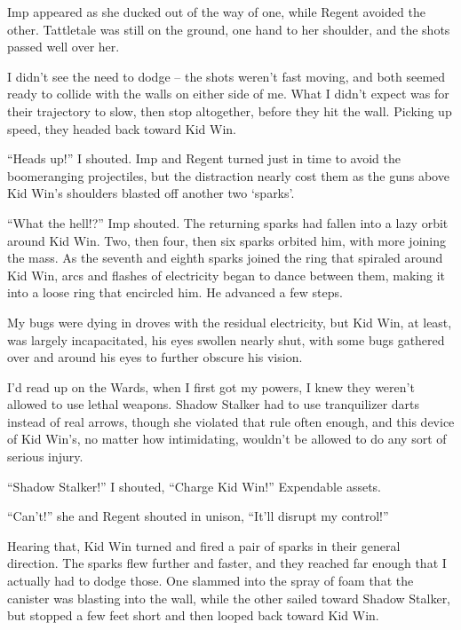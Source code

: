 Imp appeared as she ducked out of the way of one, while Regent avoided the other.  Tattletale was still on the ground, one hand to her shoulder, and the shots passed well over her.



I didn't see the need to dodge – the shots weren't fast moving, and both seemed ready to collide with the walls on either side of me.  What I didn't expect was for their trajectory to slow, then stop altogether, before they hit the wall.  Picking up speed, they headed back toward Kid Win.



``Heads up!'' I shouted.  Imp and Regent turned just in time to avoid the boomeranging projectiles, but the distraction nearly cost them as the guns above Kid Win's shoulders blasted off another two `sparks'.



``What the hell!?'' Imp shouted.  The returning sparks had fallen into a lazy orbit around Kid Win.  Two, then four, then six sparks orbited him, with more joining the mass.  As the seventh and eighth sparks joined the ring that spiraled around Kid Win, arcs and flashes of electricity began to dance between them, making it into a loose ring that encircled him.  He advanced a few steps.



My bugs were dying in droves with the residual electricity, but Kid Win, at least, was largely incapacitated, his eyes swollen nearly shut, with some bugs gathered over and around his eyes to further obscure his vision.



I'd read up on the Wards, when I first got my powers, I knew they weren't allowed to use lethal weapons.  Shadow Stalker had to use tranquilizer darts instead of real arrows, though she violated that rule often enough, and this device of Kid Win's, no matter how intimidating, wouldn't be allowed to do any sort of serious injury.



``Shadow Stalker!'' I shouted, ``Charge Kid Win!''  Expendable assets.



``Can't!'' she and Regent shouted in unison, ``It'll disrupt my control!''



Hearing that, Kid Win turned and fired a pair of sparks in their general direction.  The sparks flew further and faster, and they reached far enough that I actually had to dodge those.  One slammed into the spray of foam that the canister was blasting into the wall, while the other sailed toward Shadow Stalker, but stopped a few feet short and then looped back toward Kid Win.



